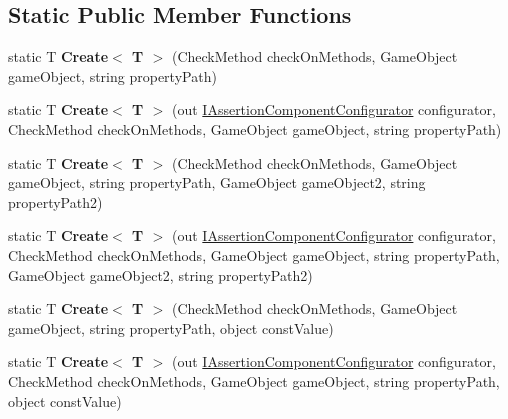 \subsection*{Static Public Member Functions}
\begin{DoxyCompactItemize}
\item 
\mbox{\label{class_unity_test_1_1_assertion_component_ae194c080238875da1786f81724b34108}} 
static T {\bfseries Create$<$ T $>$} (Check\+Method check\+On\+Methods, Game\+Object game\+Object, string property\+Path)
\item 
\mbox{\label{class_unity_test_1_1_assertion_component_a27e7ff8fdb610f5ffcd5f820b2335604}} 
static T {\bfseries Create$<$ T $>$} (out \hyperlink{interface_unity_test_1_1_i_assertion_component_configurator}{I\+Assertion\+Component\+Configurator} configurator, Check\+Method check\+On\+Methods, Game\+Object game\+Object, string property\+Path)
\item 
\mbox{\label{class_unity_test_1_1_assertion_component_a2d68966896df838fde7c74242c324122}} 
static T {\bfseries Create$<$ T $>$} (Check\+Method check\+On\+Methods, Game\+Object game\+Object, string property\+Path, Game\+Object game\+Object2, string property\+Path2)
\item 
\mbox{\label{class_unity_test_1_1_assertion_component_a4d7cea8ab750ad38760d7764d770286b}} 
static T {\bfseries Create$<$ T $>$} (out \hyperlink{interface_unity_test_1_1_i_assertion_component_configurator}{I\+Assertion\+Component\+Configurator} configurator, Check\+Method check\+On\+Methods, Game\+Object game\+Object, string property\+Path, Game\+Object game\+Object2, string property\+Path2)
\item 
\mbox{\label{class_unity_test_1_1_assertion_component_aad106ae88da6520c8d3b1fe98f064650}} 
static T {\bfseries Create$<$ T $>$} (Check\+Method check\+On\+Methods, Game\+Object game\+Object, string property\+Path, object const\+Value)
\item 
\mbox{\label{class_unity_test_1_1_assertion_component_a338274353da54a91d9c4012db8939e95}} 
static T {\bfseries Create$<$ T $>$} (out \hyperlink{interface_unity_test_1_1_i_assertion_component_configurator}{I\+Assertion\+Component\+Configurator} configurator, Check\+Method check\+On\+Methods, Game\+Object game\+Object, string property\+Path, object const\+Value)
\end{DoxyCompactItemize}
